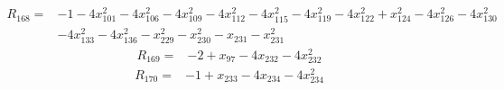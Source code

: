 \begin{align*}
 R_{168}={}&-1 -4x_{101}^{2} -4x_{106}^{2} -4x_{109}^{2} -4x_{112}^{2} -4x_{115}^{2} -4x_{119}^{2} -4x_{122}^{2} +x_{124}^{2} -4x_{126}^{2} -4x_{130}^{2}\\
 &-4x_{133}^{2} -4x_{136}^{2} -x_{229}^{2} -x_{230}^{2} -x_{231} -x_{231}^{2}
\end{align*}
\begin{align*}
 R_{169}={}&-2 +x_{97} -4x_{232} -4x_{232}^{2}
\end{align*}
\begin{align*}
 R_{170}={}&-1 +x_{233} -4x_{234} -4x_{234}^{2}
\end{align*}

